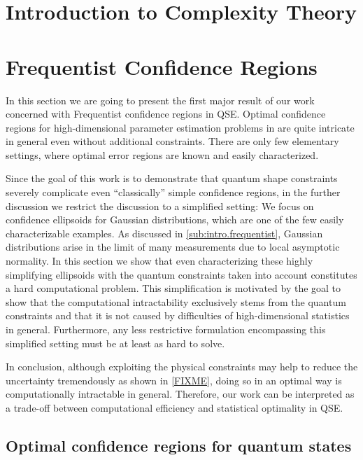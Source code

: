 \section{Introduction to Complexity Theory}
\label{sec:intro.complexity}



\section{Frequentist Confidence Regions}
\label{sec:error.frequentist}

In this section we are going to present the first major result of our work~\cite{Suess_2016_Error} concerned with Frequentist confidence regions in QSE.
Optimal confidence regions for high-dimensional parameter estimation problems in are quite intricate in general even without additional constraints.
There are only few elementary settings, where optimal error regions are known and easily characterized.

Since the goal of this work is to demonstrate that quantum shape constraints severely complicate even ``classically'' simple confidence regions, in the further discussion we restrict the discussion to a simplified setting:
We focus on confidence ellipsoids for Gaussian distributions, which are one of the few easily characterizable examples.
As discussed in \cref{sub:intro.frequentist}, Gaussian distributions arise in the limit of many measurements due to local asymptotic normality.
In this section we show that even characterizing these highly simplifying ellipsoids with the quantum constraints taken into account constitutes a hard computational problem.
This simplification is motivated by the goal to show that the computational intractability exclusively stems from the quantum constraints and that it is not caused by difficulties of high-dimensional statistics in general.
Furthermore, any less restrictive formulation encompassing this simplified setting must be at least as hard to solve.

In conclusion, although exploiting the physical constraints may help to reduce the uncertainty tremendously as shown in \cref{FIXME}, doing so in an optimal way is computationally intractable in general.
Therefore, our work can be interpreted as a trade-off between computational efficiency and statistical optimality in QSE.

\subsection{Optimal confidence regions for quantum states}
\label{sub:ortho.optimal}

